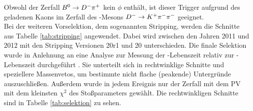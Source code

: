 Obwohl der Zerfall ${{B}^0}\rightarrow {\ensuremath{{D}^-}}{\ensuremath{{\pi}^+}}$ kein $\phi$ enthält, ist dieser Trigger aufgrund des geladenen Kaons im Zerfall des \D-Mesons ${{D}^-}\rightarrow {\ensuremath{{K}^+}}{\ensuremath{{\pi}^-}}{\ensuremath{{\pi}^-}}$ geeignet.\\
Bei der weiteren Vorselektion, dem sogenannten Stripping, werden die Schnitte aus Tabelle \ref{tab:stripping} angewendet. Dabei wird zwischen den Jahren 2011 und 2012 mit den Stripping Versionen 20r1 und 20 unterschieden. Die finale Selektion wurde in Anlehnung an eine Analyse zur Messung der \Bs-Lebenszeit relativ zur \Bz-Lebenszeit durchgeführt \cite{selektion}. Sie unterteilt sich in rechtwinklige Schnitte und speziellere Massenvetos, um bestimmte nicht flache (peakende) Untergründe auszuschließen. Außerdem wurde in jedem Ereignis nur der Zerfall mit dem PV mit dem kleinsten $\chi^2$ des Stoßparameters gewählt. Die rechtwinkligen Schnitte sind in Tabelle \ref{tab:selektion} zu sehen.
